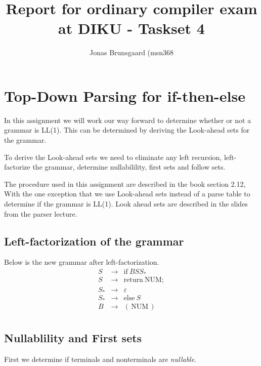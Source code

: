 \documentclass[11pt,a4paper]{article}
\title{Report for ordinary compiler exam at DIKU - Taskset 4}
\author{Jonas Brunsgaard (msn368}
\begin{document}
\maketitle

\section{Top-Down Parsing for if-then-else}
In this assignment we will work our way forward to determine whether or not
a grammar is LL(1). This can be determined by deriving the Look-ahead sets for
the grammar.

To derive the Look-ahead sets we need to eliminate any left
recursion, left-factorize the grammar, determine nullabilility, first sets
and follow sets.

The procedure used in this assignment are described in
the book section 2.12, With the one exception that we use Look-ahead sets
instead of a parse table to determine if the grammar is LL(1). Look ahead sets
are described in the slides from the parser lecture.

\subsection{Left-factorization of the grammar}
Below is the new grammar after left-factorization.
$$
\begin{array}{lcl}
    S & \rightarrow & \mathrm{if\:}BSS_* \\
    S & \rightarrow & \mathrm{return\:NUM;} \\
    S_* & \rightarrow & \varepsilon \\
    S_* & \rightarrow & \mathrm{else}\:S \\
    B & \rightarrow & \mathrm{(\,NUM\,)} \\
\end{array}
$$

\subsection{Nullablility and First sets}

First we determine if terminals and nonterminals are \emph{nullable}.
\end{document}
